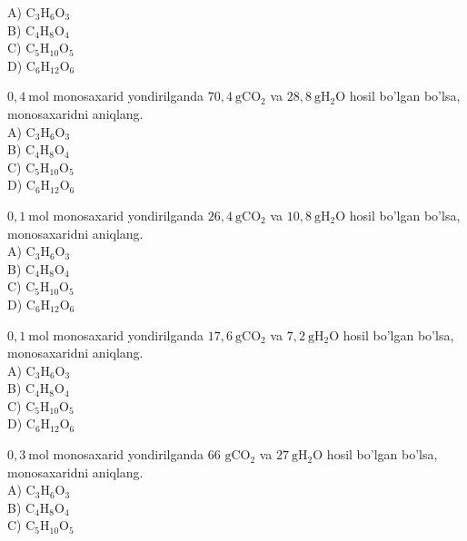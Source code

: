 A) $\mathrm{C}_{3} \mathrm{H}_{6} \mathrm{O}_{3}$\\
B) $\mathrm{C}_{4} \mathrm{H}_{8} \mathrm{O}_{4}$\\
C) $\mathrm{C}_{5} \mathrm{H}_{10} \mathrm{O}_{5}$\\
D) $\mathrm{C}_{6} \mathrm{H}_{12} \mathrm{O}_{6}$
  \item $0,4 \mathrm{~mol}$ monosaxarid yondirilganda $70,4 \mathrm{~g} \mathrm{CO}_{2}$ va $28,8 \mathrm{~g} \mathrm{H}_{2} \mathrm{O}$ hosil bo'lgan bo'lsa, monosaxaridni aniqlang.\\
A) $\mathrm{C}_{3} \mathrm{H}_{6} \mathrm{O}_{3}$\\
B) $\mathrm{C}_{4} \mathrm{H}_{8} \mathrm{O}_{4}$\\
C) $\mathrm{C}_{5} \mathrm{H}_{10} \mathrm{O}_{5}$\\
D) $\mathrm{C}_{6} \mathrm{H}_{12} \mathrm{O}_{6}$
  \item $0,1 \mathrm{~mol}$ monosaxarid yondirilganda $26,4 \mathrm{~g} \mathrm{CO}_{2}$ va $10,8 \mathrm{~g} \mathrm{H}_{2} \mathrm{O}$ hosil bo'lgan bo'lsa, monosaxaridni aniqlang.\\
A) $\mathrm{C}_{3} \mathrm{H}_{6} \mathrm{O}_{3}$\\
B) $\mathrm{C}_{4} \mathrm{H}_{8} \mathrm{O}_{4}$\\
C) $\mathrm{C}_{5} \mathrm{H}_{10} \mathrm{O}_{5}$\\
D) $\mathrm{C}_{6} \mathrm{H}_{12} \mathrm{O}_{6}$
  \item $0,1 \mathrm{~mol}$ monosaxarid yondirilganda $17,6 \mathrm{~g} \mathrm{CO}_{2}$ va $7,2 \mathrm{~g} \mathrm{H}_{2} \mathrm{O}$ hosil bo'lgan bo'lsa, monosaxaridni aniqlang.\\
A) $\mathrm{C}_{3} \mathrm{H}_{6} \mathrm{O}_{3}$\\
B) $\mathrm{C}_{4} \mathrm{H}_{8} \mathrm{O}_{4}$\\
C) $\mathrm{C}_{5} \mathrm{H}_{10} \mathrm{O}_{5}$\\
D) $\mathrm{C}_{6} \mathrm{H}_{12} \mathrm{O}_{6}$
  \item $0,3 \mathrm{~mol}$ monosaxarid yondirilganda 66 $\mathrm{g} \mathrm{CO}_{2}$ va $27 \mathrm{~g} \mathrm{H}_{2} \mathrm{O}$ hosil bo'lgan bo'lsa, monosaxaridni aniqlang.\\
A) $\mathrm{C}_{3} \mathrm{H}_{6} \mathrm{O}_{3}$\\
B) $\mathrm{C}_{4} \mathrm{H}_{8} \mathrm{O}_{4}$\\
C) $\mathrm{C}_{5} \mathrm{H}_{10} \mathrm{O}_{5}$\\
